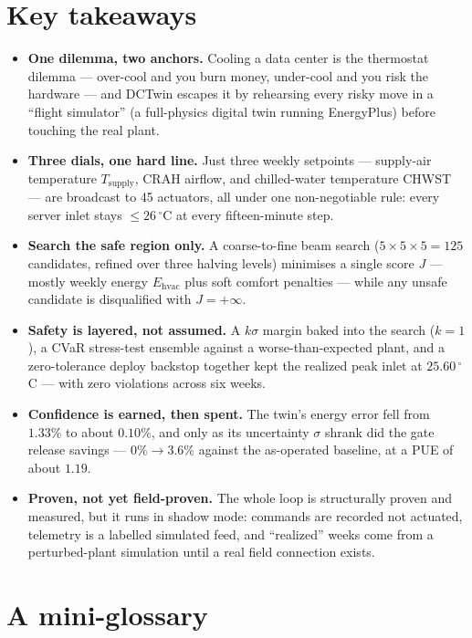 \section*{Key takeaways}

\begin{keyidea}
\begin{itemize}
  \item \textbf{One dilemma, two anchors.} Cooling a data center is the thermostat dilemma --- over-cool and you burn money, under-cool and you risk the hardware --- and DCTwin escapes it by rehearsing every risky move in a ``flight simulator'' (a full-physics digital twin running EnergyPlus) before touching the real plant.
  \item \textbf{Three dials, one hard line.} Just three weekly setpoints --- supply-air temperature $T_{\text{supply}}$, CRAH airflow, and chilled-water temperature CHWST --- are broadcast to 45 actuators, all under one non-negotiable rule: every server inlet stays $\le 26\,^\circ$C at every fifteen-minute step.
  \item \textbf{Search the safe region only.} A coarse-to-fine beam search ($5\times5\times5 = 125$ candidates, refined over three halving levels) minimises a single score $J$ --- mostly weekly energy $E_{\text{hvac}}$ plus soft comfort penalties --- while any unsafe candidate is disqualified with $J = +\infty$.
  \item \textbf{Safety is layered, not assumed.} A $k\sigma$ margin baked into the search ($k=1$), a CVaR stress-test ensemble against a worse-than-expected plant, and a zero-tolerance deploy backstop together kept the realized peak inlet at $25.60\,^\circ$C --- with zero violations across six weeks.
  \item \textbf{Confidence is earned, then spent.} The twin's energy error fell from $1.33\%$ to about $0.10\%$, and only as its uncertainty $\sigma$ shrank did the gate release savings --- $0\% \to 3.6\%$ against the as-operated baseline, at a PUE of about $1.19$.
  \item \textbf{Proven, not yet field-proven.} The whole loop is structurally proven and measured, but it runs in shadow mode: commands are recorded not actuated, telemetry is a labelled simulated feed, and ``realized'' weeks come from a perturbed-plant simulation until a real field connection exists.
\end{itemize}
\end{keyidea}

\section*{A mini-glossary}

